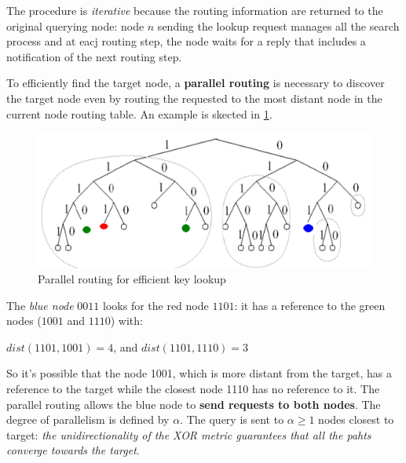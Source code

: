 \documentclass[10pt,a4paper]{report}
\begin{document}
The procedure is \textit{iterative} because the routing information are returned to the original querying node: node $n$ sending the lookup request manages all the search process and at eacj routing step, the node waits for a reply that includes a notification of the next routing step.

To efficiently find the target node, a \textbf{parallel routing} is necessary to discover the target node even by routing the requested to the most distant node in the current node routing table. An example is skected in \ref{eg6-lookup}.
\begin{figure}[h]
	\centering
	\includegraphics[scale=0.60]{images/Pasted image 20230308112720.png}
	\caption{Parallel routing for efficient key lookup}
	\label{eg6-lookup}
\end{figure}

The \textit{blue node} $0011$ looks for the red node $1101$: it has a reference to the green nodes ($1001$ and $1110$) with:
\begin{center}
	$dist (1101, 1001)=4$, and $dist(1101,1110)= 3$
\end{center}

So it's possible that the node 1001, which is more distant from the target, has a reference to the target while the closest node 1110 has no reference to it. The parallel routing allows the blue node to \textbf{send requests to both nodes}.
The degree of parallelism is defined by $\alpha$.
The query is sent to $\alpha \ge 1$ nodes closest to target: \textit{the unidirectionality of the XOR metric guarantees that all the pahts converge towards the target}.
\end{document}
